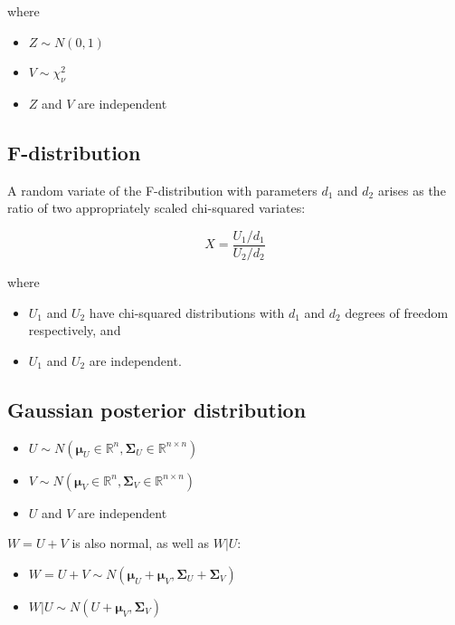 \documentclass{article}
\begin{document}
\begin{appendices}
where

\begin{itemize}
    \item $Z\sim N(0,1)$
    \item $V\sim \chi_{\nu}^{2}$
    \item $Z$ and $V$ are independent
\end{itemize}

\subsection{F-distribution} \label{app:F_distribution}

A random variate of the F-distribution with parameters $d_1$ and $d_2$ arises as the ratio of two appropriately scaled chi-squared variates:

\begin{equation}
    X = \frac{U_1 / d_1}{U_2 / d_2}
\end{equation}

where

\begin{itemize}
    \item $U_{1}$ and $U_{2}$ have chi-squared distributions with $d_{1}$ and $d_{2}$ degrees of freedom respectively, and
    \item $U_{1}$ and $U_{2}$ are independent.
\end{itemize}

\subsection{Gaussian posterior distribution} \label{app:Gaussian_posterior}

\begin{itemize}
    \item $U \sim N(\bm{\mu}_U \in \mathbb{R}^n, \bm{\Sigma}_U \in \mathbb{R}^{n\times n})$
    \item $V \sim N(\bm{\mu}_V \in \mathbb{R}^n, \bm{\Sigma}_V \in \mathbb{R}^{n\times n})$
    \item $U$ and $V$ are independent
\end{itemize}

$W = U + V$ is also normal, as well as $W|U$:

\begin{itemize}
    \item $W = U + V \sim N(\bm{\mu}_U + \bm{\mu}_V, \bm{\Sigma}_U + \bm{\Sigma}_V)$
    \item $W|U \sim N(U + \bm{\mu}_V, \bm{\Sigma}_V)$
\end{itemize}


\end{appendices}
\end{document}
